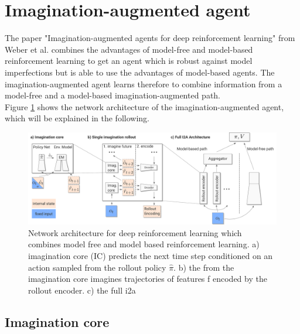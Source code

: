 \section{Imagination-augmented agent} 
\label{sec:i2a} 
 
The paper "Imagination-augmented agents for deep reinforcement learning" from Weber et al. \cite{I2A} combines the advantages of model-free and model-based reinforcement learning to get an agent which is robust against model imperfections but is able to use the advantages of model-based agents.
The imagination-augmented agent learns therefore to combine information from a model-free and a model-based imagination-augmented path.\\

 
Figure \ref{fig:i2a_architecture} shows the network architecture of the imagination-augmented agent, which will be explained in the following.

\begin{figure}[H] 
  \centering 
   
  \includegraphics[width=\columnwidth]{./Images/i2a_architecture.pdf} 
  \caption{Network architecture for deep reinforcement learning which combines model free and model based reinforcement learning. a) imagination core (IC) predicts the next time step conditioned on an action sampled from the rollout policy $\hat{\pi}$. b) the from the imagination core imagines trajectories of features f encoded by the rollout encoder. c) the full i2a} 
  \label{fig:i2a_architecture} 
\end{figure}

 
\subsection{Imagination core}

